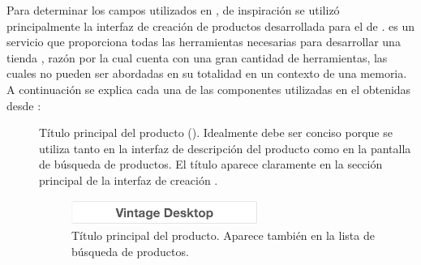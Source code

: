 		Para determinar los campos utilizados en , de inspiración se utilizó principalmente la interfaz de creación de productos desarrollada para el \websiteINT de \shopifyNAME {}. \shopifyNAME es un servicio que proporciona todas las herramientas necesarias para desarrollar una tienda \online, razón por la cual cuenta con una gran cantidad de herramientas, las cuales no pueden ser abordadas en su totalidad en un contexto de una memoria. A continuación se explica cada una de las componentes utilizadas en el \frameworkPC obtenidas desde  \websiteINT \shopifyNAME:

		\begin{description}
			\item [\titleForm]
				Título principal del producto (). Idealmente debe ser conciso porque se utiliza tanto en la interfaz de descripción del producto como en la pantalla de búsqueda de productos. El título aparece claramente en la sección principal de la interfaz de creación .

				\begin{figure}[H]
					\centering
					\includegraphics[width=0.6\textwidth]{figuras/productos/details/write/main_tittle.png}

					\caption{Título principal del producto. Aparece también en la lista de búsqueda de productos.}
					\label{figure:productos:details:write:main_tittle}
				\end{figure}





\end{description}
